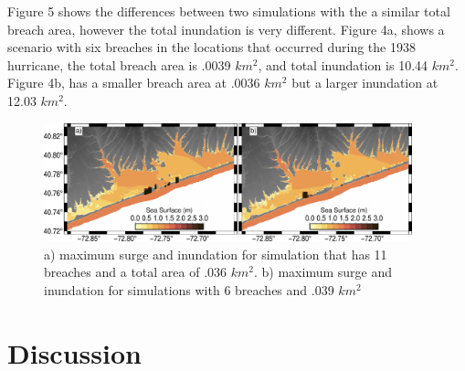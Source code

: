 \documentclass{coastal_paper}
\begin{document}
Figure 5 shows the differences between two simulations with the a similar total breach area, however the total inundation is very different. Figure 4a, shows a scenario with six breaches in the locations that occurred during the 1938 hurricane, the total breach area is .0039 $km^2$, and total inundation is 10.44 $km^2$. Figure 4b, has a smaller breach area at .0036 $km^2$ but a larger inundation at 12.03 $km^2$.


\begin{figure}
    \centering
    \includegraphics[width=0.95\textwidth]{figures/fig5.pdf}
    \caption{a) maximum surge and inundation for simulation that has 11 breaches and a total area of .036 $km^2$. b) maximum surge and inundation for simulations with 6 breaches and .039 $km^2$}
    \label{fig5}
\end{figure}





\section{Discussion}
\end{document}
